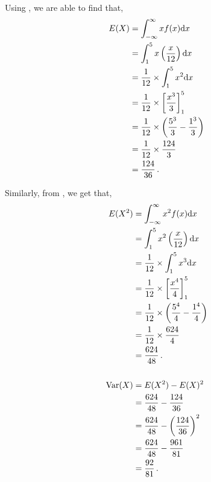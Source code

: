 \begin{subquestions}

\subquestion

Using , we are able to find that,
\begin{align}
	E(X) & = \int_{-\infty}^{\infty} xf(x)\mathrm{d}x \nonumber \\
		 & = \int_{1}^{5} x\left( \frac{x}{12}\right)\mathrm{d}x \nonumber \\
		 & = \frac{1}{12} \times \int_{1}^{5} x^2\mathrm{d}x \nonumber \\ 
		 & = \frac{1}{12} \times \left[\frac{x^3}{3}\right]^5_1 \nonumber \\
		 & = \frac{1}{12} \times \left(\frac{5^3}{3}-\frac{1^3}{3}\right) \nonumber \\
		 & = \frac{1}{12} \times \frac{124}{3} \nonumber \\
		 & = \frac{124}{36} \,.
\end{align}

Similarly, from , we get that,
\begin{align}
	E(X^2) & = \int_{-\infty}^{\infty} x^2f(x)\mathrm{d}x \nonumber \\
	& = \int_{1}^{5} x^2\left( \frac{x}{12}\right)\mathrm{d}x \nonumber \\
	& = \frac{1}{12} \times \int_{1}^{5} x^3\mathrm{d}x \nonumber \\ 
	& = \frac{1}{12} \times \left[\frac{x^4}{4}\right]^5_1 \nonumber \\
	& = \frac{1}{12} \times \left(\frac{5^4}{4}-\frac{1^4}{4}\right) \nonumber \\
	& = \frac{1}{12} \times \frac{624}{4} \nonumber \\
	& = \frac{624}{48} \,. \\ \nonumber \\
	\text{Var}(X) & = E(X^2) - E(X)^2 \nonumber \\
	                & = \frac{624}{48} - \frac{124}{36} \nonumber \\
	                & = \frac{624}{48} - \left(\frac{124}{36}\right)^2 \nonumber \\
	                & = \frac{624}{48}-\frac{961}{81} \nonumber \\
	                & = \frac{92}{81} \,.
\end{align}



\end{subquestions}
